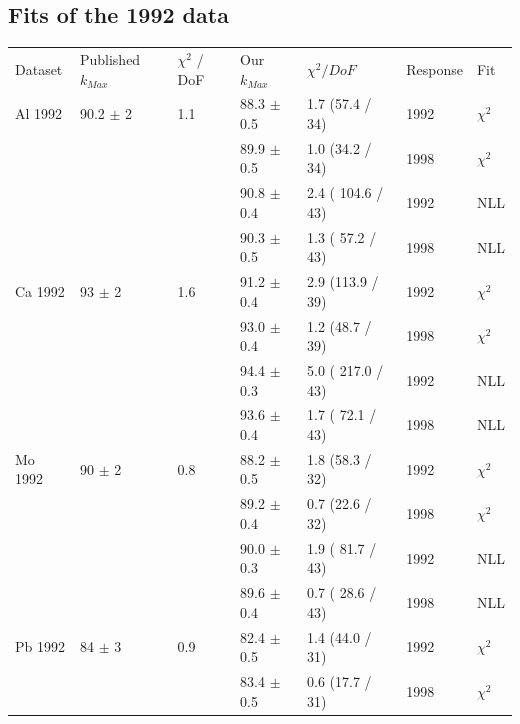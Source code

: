 \subsection { Fits of the 1992 data }
\begin{table}[H]
  \begin{center}
    \begin{tabular}{|l||l|l|l|l|l|l|}
      \hline
      Dataset & Published $k_{Max}$ & $\chi^2$ / DoF & Our $k_{Max}$ & $\chi^2 / DoF$  & Response & Fit \\
      \hhline{|=||=|=|=|=|=|=|}
       Al 1992   & 90.2 $\pm$ 2   & 1.1 & 88.3 $\pm$ 0.5 & 1.7 (57.4 / 34)  & 1992 & $\chi^2$ \\  
                 &                &     & 89.9 $\pm$ 0.5 & 1.0 (34.2 / 34)  & 1998 & $\chi^2$ \\  
                                       
                 &                &     & 90.8 $\pm$ 0.4 & 2.4 ( 104.6 / 43) & 1992 & NLL \\
                 &                &     & 90.3 $\pm$ 0.5 & 1.3 ( 57.2 / 43)  & 1998 & NLL \\
       \hline                           
       Ca 1992   & 93   $\pm$ 2   & 1.6 & 91.2 $\pm$ 0.4 & 2.9 (113.9 / 39) & 1992 & $\chi^2$ \\  
                 &                &     & 93.0 $\pm$ 0.4 & 1.2 (48.7 / 39)  & 1998 & $\chi^2$ \\  
                                                                            
                 &                &     & 94.4 $\pm$ 0.3 & 5.0 ( 217.0 / 43) & 1992 & NLL \\
                 &                &     & 93.6 $\pm$ 0.4 & 1.7 ( 72.1 / 43) & 1998 & NLL \\
      \hline                           
       Mo 1992   & 90   $\pm$ 2   & 0.8 & 88.2 $\pm$ 0.5 & 1.8 (58.3 / 32)  & 1992 & $\chi^2$ \\  
                 &                &     & 89.2 $\pm$ 0.4 & 0.7 (22.6 / 32)  & 1998 & $\chi^2$ \\  
                                                                            
                 &                &     & 90.0 $\pm$ 0.3 & 1.9 ( 81.7 / 43) & 1992 & NLL \\
                 &                &     & 89.6 $\pm$ 0.4 & 0.7 ( 28.6 / 43) & 1998 & NLL \\
      \hline                           
       Pb 1992   & 84   $\pm$ 3   & 0.9 & 82.4 $\pm$ 0.5 & 1.4 (44.0 / 31)  & 1992 & $\chi^2$ \\  
                 &                &     & 83.4 $\pm$ 0.5 & 0.6 (17.7 / 31)  & 1998 & $\chi^2$ \\  
                                        

\end{tabular}
\end{center}
\end{table}
